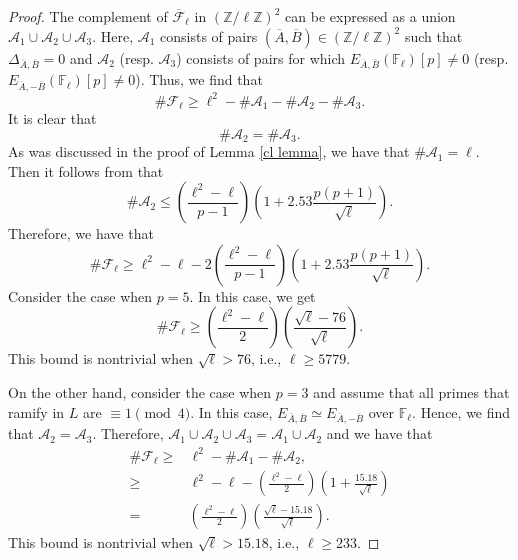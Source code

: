 \documentclass[12pt]{amsart}
\newcommand{\cF}{\mathcal{F}}
\newcommand{\Z}{\mathbb{Z}}
\newcommand{\F}{\mathbb{F}}
\numberwithin{equation}{section}
\begin{document}
\begin{proof}
    The complement of $\overline{\cF}_\ell$ in $(\Z/\ell\Z)^2$ can be expressed as a union $\mathcal{A}_1\cup \mathcal{A}_2\cup \mathcal{A}_3$. Here, $\mathcal{A}_1$ consists of pairs $(\overline{A}, \overline{B})\in (\Z/\ell\Z)^2$ such that $\Delta_{\overline{A}, \overline{B}}=0$ and $\mathcal{A}_2$ (resp. $\mathcal{A}_3$) consists of pairs for which $E_{\overline{A}, \overline{B}}(\F_\ell)[p]\neq 0$ (resp. $E_{\overline{A}, -\overline{B}}(\F_\ell)[p]\neq 0$). Thus, we find that 
     \[\# \cF_\ell\geq \ell^2-\# \mathcal{A}_1-\# \mathcal{A}_2-\# \mathcal{A}_3 .\]It is clear that 
     \[\# \mathcal{A}_2=\# \mathcal{A}_3.\]As was discussed in the proof of Lemma \ref{cl lemma}, we have that $\# \mathcal{A}_1=\ell$. Then it follows from \cite{Howe} that 
     \[\# \mathcal{A}_2\leq  \left(\frac{\ell^2-\ell}{p-1}\right)\left(1+2.53 \frac{p(p+1)}{\sqrt{\ell}}\right).\]
     Therefore, we have that 
     \[\# \cF_\ell\geq \ell^2-\ell- 2 \left(\frac{\ell^2-\ell}{p-1}\right)\left(1+2.53 \frac{p(p+1)}{\sqrt{\ell}}\right).\]
     Consider the case when $p=5$. In this case, we get 
      \[\# \cF_\ell\geq \left(\frac{\ell^2-\ell}{2}\right)\left( \frac{\sqrt{\ell}-76}{\sqrt{\ell}}\right).\]
      This bound is nontrivial when $\sqrt{\ell}>76$, i.e., $\ell\geq 5779$. 
      \par On the other hand, consider the case when $p=3$ and assume that all primes that ramify in $L$ are $\equiv 1\pmod{4}$. In this case, $E_{\overline{A}, \overline{B}}\simeq E_{\overline{A}, -\overline{B}}$ over $\F_\ell$. Hence, we find that $\mathcal{A}_2=\mathcal{A}_3$. Therefore, $\mathcal{A}_1 \cup \mathcal{A}_2 \cup \mathcal{A}_3= \mathcal{A}_1 \cup \mathcal{A}_2$ and we have that 
     \[\begin{split} \# \cF_\ell \geq &
      \ell^2-\# \mathcal{A}_1-\#\mathcal{A}_2,\\
     \geq & \ell^2-\ell- \left(\frac{\ell^2-\ell}{2}\right)\left(1+ \frac{15.18}{\sqrt{\ell}}\right)\\
     = & \left(\frac{\ell^2-\ell}{2}\right)\left(\frac{\sqrt{\ell}-15.18}{\sqrt{\ell}}\right).
     \end{split}\]
     This bound is nontrivial when $\sqrt{\ell}>15.18$, i.e., $\ell\geq 233$.
\end{proof}
\end{document}
